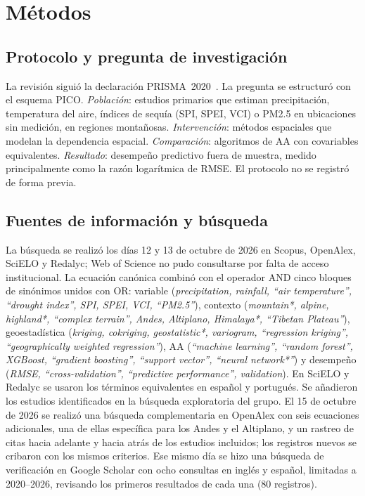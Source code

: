 \documentclass[conference]{IEEEtran}
\begin{document}
\section{Métodos}

\subsection{Protocolo y pregunta de investigación}
La revisión siguió la declaración PRISMA~2020~\cite{page2021}. La pregunta se estructuró con el esquema PICO. \emph{Población}: estudios primarios que estiman precipitación, temperatura del aire, índices de sequía (SPI, SPEI, VCI) o PM2.5 en ubicaciones sin medición, en regiones montañosas. \emph{Intervención}: métodos espaciales que modelan la dependencia espacial. \emph{Comparación}: algoritmos de AA con covariables equivalentes. \emph{Resultado}: desempeño predictivo fuera de muestra, medido principalmente como la razón logarítmica de RMSE. El protocolo no se registró de forma previa.

\subsection{Fuentes de información y búsqueda}
La búsqueda se realizó los días 12 y 13 de octubre de 2026 en Scopus, OpenAlex, SciELO y Redalyc; Web of Science no pudo consultarse por falta de acceso institucional. La ecuación canónica combinó con el operador AND cinco bloques de sinónimos unidos con OR: variable (\textit{precipitation, rainfall, ``air temperature'', ``drought index'', SPI, SPEI, VCI, ``PM2.5''}), contexto (\textit{mountain*, alpine, highland*, ``complex terrain'', Andes, Altiplano, Himalaya*, ``Tibetan Plateau''}), geoestadística (\textit{kriging, cokriging, geostatistic*, variogram, ``regression kriging'', ``geographically weighted regression''}), AA (\textit{``machine learning'', ``random forest'', XGBoost, ``gradient boosting'', ``support vector'', ``neural network*''}) y desempeño (\textit{RMSE, ``cross-validation'', ``predictive performance'', validation}). En SciELO y Redalyc se usaron los términos equivalentes en español y portugués. Se añadieron los estudios identificados en la búsqueda exploratoria del grupo. El 15 de octubre de 2026 se realizó una búsqueda complementaria en OpenAlex con seis ecuaciones adicionales, una de ellas específica para los Andes y el Altiplano, y un rastreo de citas hacia adelante y hacia atrás de los estudios incluidos; los registros nuevos se cribaron con los mismos criterios. Ese mismo día se hizo una búsqueda de verificación en Google Scholar con ocho consultas en inglés y español, limitadas a 2020--2026, revisando los primeros resultados de cada una (80 registros).
\end{document}
